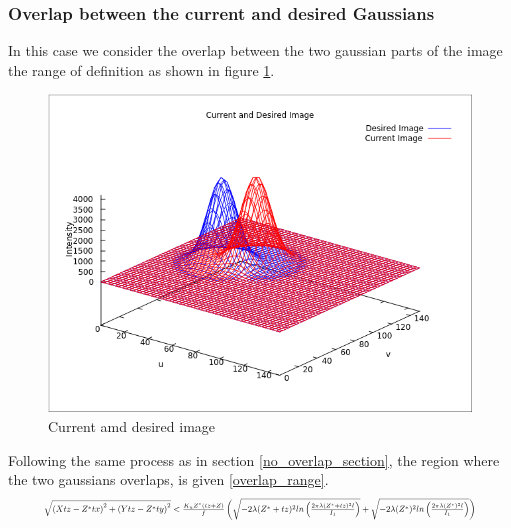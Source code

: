 \subsubsection{Overlap between the current and desired Gaussians}\label{overlap_section}
In this case we consider the overlap between the two gaussian parts of the image the range of definition as shown in figure \ref{overlap}. 
\begin{figure}[h!]
    \centering
    \includegraphics[scale = 0.5]{figures/overlap.png}
    \caption{Current amd desired image }
    \label{overlap}
\end{figure}
Following the same process as in section \ref{no_overlap_section}, the region where the two gaussians overlaps, is given \eqref{overlap_range}.
\begin{equation}
    \resizebox{.9\hsize}{!}{$\sqrt{\left(Xtz-Z^{*}tx\right)^{2}+\left(Ytz-Z^{*}ty\right)^{2}} < \frac{K_{u}Z^{*}\left(tz+Z\right)}{f} \left(\sqrt{-2\lambda(Z^{*}+tz)^{2} ln\left( \frac{2\pi\lambda(Z^{*}+tz)^{2}l}{I_{1}}\right)}+ \sqrt{-2\lambda(Z^{*})^{2} ln\left( \frac{2\pi\lambda(Z^{*})^{2}l}{I_{1}}\right)} \right)$}
    \label{overlap_range}
\end{equation}

